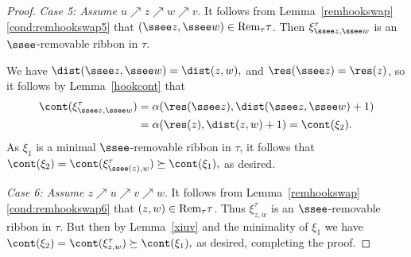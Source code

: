 \begin{proof}
{\em Case 5: Assume \(u \nearrow z \nearrow w \nearrow v\)}. It follows from Lemma~\ref{remhookswap}\eqref{cond:remhookswap5} that \((\ssee z, \ssee w) \in \textup{Rem}_\tau\tau\). Then \(\xi^\tau_{\ssee z, \ssee w}\) is an \(\ssee\)-removable ribbon in \(\tau\). 

We have
\(
 \dist(\ssee z,\ssee w) = \dist (z,w),
\)
 and
\(
 \res(\ssee z) = \res(z)
\), so it follows by Lemma~\ref{hookcont} that 
 \begin{align*}
 \cont(\xi^\tau_{\ssee z,\ssee w}) &= \alpha(\res(\ssee z), \dist(\ssee z,\ssee w)+1)\\
 &= \alpha(\res(z),\dist(z,w)+1) = \cont(\xi_2).
 \end{align*}
As \(\xi_1\) is a minimal \(\ssee\)-removable ribbon in \(\tau\), it follows that
\(
\cont(\xi_2) = \cont(\xi^\tau_{\ssee(z),w}) \succeq \cont(\xi_1),
\)
as desired.

{\em Case 6: Assume \(z \nearrow u \nearrow v \nearrow w\)}.  It follows from Lemma~\ref{remhookswap}\eqref{cond:remhookswap6} that \((z, w) \in \textup{Rem}_\tau\tau\). Thus \(\xi^\tau_{z,w}\) is an \(\ssee\)-removable ribbon in \(\tau\). 
But then by Lemma~\ref{xiuv} and the minimality of \(\xi_1\) we have
\(
\cont(\xi_2) =\cont(\xi^\tau_{z,w}) \succeq \cont(\xi_1),
\)
as desired, completing the proof. 
\end{proof}
